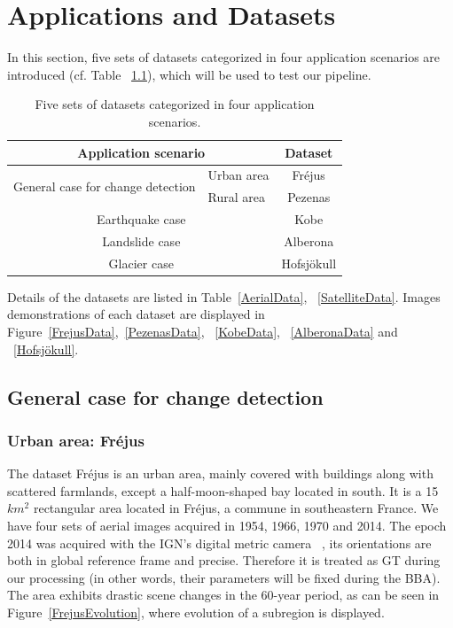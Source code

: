 
\chapter{Applications and Datasets}
\label{ApplicationsAndDatasets}
In this section, five sets of datasets categorized in four application scenarios are introduced (cf. Table ~\ref{application}), which will be used to test our pipeline.

\begin{table}[htbp]
	\centering
	\begin{tabular}{||l|l||c||}\hline
		 \multicolumn{2}{||c||}{Application scenario} & Dataset \\\hline\hline
		 \multirow{2}{*}{General case for change detection} & Urban area & Fr{\'e}jus \\
		 & Rural area & Pezenas \\\hline
		 \multicolumn{2}{||c||}{Earthquake case} & Kobe \\\hline
		 \multicolumn{2}{||c||}{Landslide case} & Alberona \\\hline
		 \multicolumn{2}{||c||}{Glacier case} & Hofsjökull \\\hline
	\end{tabular}
	\caption{Five sets of datasets categorized in four application scenarios.}
	\label{application}
\end{table}

Details of the datasets are listed in Table~\ref{AerialData}, ~\ref{SatelliteData}. 
Images demonstrations of each dataset are displayed in Figure~\ref{FrejusData},~\ref{PezenasData}, ~\ref{KobeData}, ~\ref{AlberonaData} and ~\ref{Hofsjökull}.


\section{General case for change detection}
\subsection{Urban area: Fr{\'e}jus}
The dataset Fr{\'e}jus is an urban area, mainly covered with buildings along with scattered farmlands, except a half-moon-shaped bay located in south. It is a 15 $km^2$ rectangular area located in Fr{\'e}jus, a commune in southeastern France. We have four sets of aerial images acquired in 1954, 1966, 1970 and 2014. The epoch 2014 was acquired with the \ac{IGN}'s digital metric camera ~\cite{souchon2010ign}, its orientations are both in global reference frame and precise. Therefore it is treated as \ac{GT} during our processing (in other words, their parameters will be fixed during the \ac{BBA}). 
The area exhibits drastic scene changes in the 60-year period, as can be seen in Figure~\ref{FrejusEvolution}, where evolution of a subregion is displayed.\\

